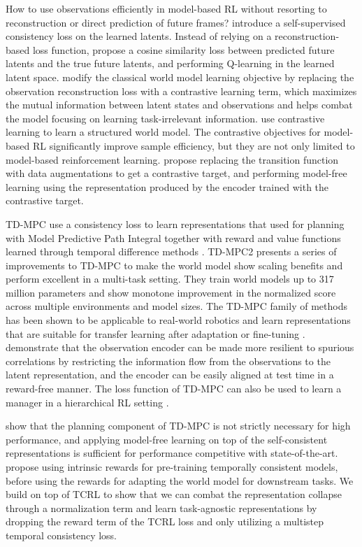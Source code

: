 \documentclass{article}
\theoremstyle{plain}
\theoremstyle{definition}
\theoremstyle{remark}
\begin{document}
How to use observations efficiently in model-based RL without resorting to reconstruction or direct prediction of future frames? \citet{ye2021mastering} introduce a self-supervised consistency loss on the learned latents. Instead of relying on a reconstruction-based loss function, \citet{schwarzer2020data} propose a cosine similarity loss between predicted future latents and the true future latents, and performing Q-learning in the learned latent space. \citet{ma2021contrastive} modify the classical world model learning objective by replacing the observation reconstruction loss with a contrastive learning term, which maximizes the mutual information between latent states and observations and helps combat the model focusing on learning task-irrelevant information. \citet{kipf2019contrastive} use contrastive learning to learn a structured world model. The contrastive objectives for model-based RL significantly improve sample efficiency, but they are not only limited to model-based reinforcement learning. \citet{laskinCURLContrastiveUnsupervised2020} propose replacing the transition function with data augmentations to get a contrastive target, and performing model-free learning using the representation produced by the encoder trained with the contrastive target.

TD-MPC \cite{hansenTemporalDifferenceLearning2022} use a consistency loss to learn representations that used for planning with Model Predictive Path Integral together with reward and value functions learned through temporal difference methods \cite{williams2015model}. TD-MPC2 \cite{hansen2023td} presents a series of improvements to TD-MPC to make the world model show scaling benefits and perform excellent in a multi-task setting. They train world models up to 317 million parameters and show monotone improvement in the normalized score across multiple environments and model sizes. The TD-MPC family of methods has been shown to be applicable to real-world robotics \cite{lancaster2023modem} and learn representations that are suitable for transfer learning after adaptation \cite{yang2023movie} or fine-tuning \cite{feng2023finetuning}. \citet{zhu2023repo} demonstrate that the observation encoder can be made more resilient to spurious correlations by restricting the information flow from the observations to the latent representation, and the encoder can be easily aligned at test time in a reward-free manner. The loss function of TD-MPC can also be used to learn a manager in a hierarchical RL setting \cite{chitnis2023iql}.

\citet{zhaoSimplifiedTemporalConsistency2023} show that the planning component of TD-MPC is not strictly necessary for high performance, and applying model-free learning on top of the self-consistent representations is sufficient for performance competitive with state-of-the-art. \citet{yuan2022euclid} propose using intrinsic rewards for pre-training temporally consistent models, before using the rewards for adapting the world model for downstream tasks. We build on top of TCRL to show that we can combat the representation collapse through a normalization term and learn task-agnostic representations by dropping the reward term of the TCRL loss and only utilizing a multistep temporal consistency loss.
\end{document}
